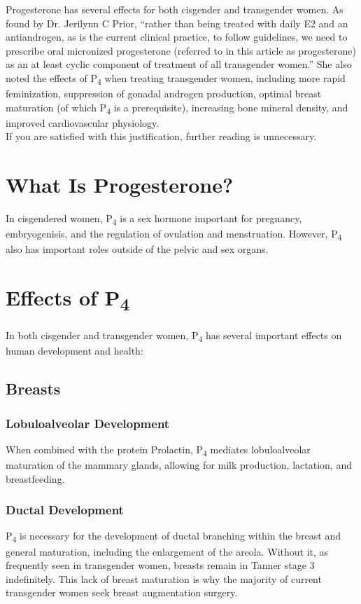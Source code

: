 \documentclass[
	secnumdepth=3, %
]{kaohandt}
\newcommand\tsub[1]{\textsubscript{#1}}
\begin{document}
\noindent Progesterone has several effects for both cisgender and transgender women. As found by Dr. Jerilynn C Prior, ``rather than being treated with daily E2 and an antiandrogen, as is the current clinical practice, to follow guidelines, we need to prescribe oral micronized progesterone (referred to in this article as progesterone) as an at least cyclic component of treatment of all transgender women.'' She also noted the effects of P\tsub{4} when treating transgender women, including more rapid feminization, suppression of gonadal androgen production, optimal breast maturation (of which P\tsub{4} is a prerequisite), increasing bone mineral density, and improved cardiovascular physiology.\\

\noindent If you are satisfied with this justification, further reading is unnecessary.

\section{What Is Progesterone?}

In cisgendered women, P\tsub{4} is a sex hormone important for pregnancy, embryogenisis, and the regulation of ovulation and menstruation. However, P\tsub{4} also has important roles outside of the pelvic and sex organs.

\section{Effects of P\tsub{4}}
In both cisgender and transgender women, P\tsub{4} has several important effects on human development and health:
\subsection{Breasts}

\subsubsection{Lobuloalveolar Development}
When combined with the protein Prolactin, P\tsub{4} mediates lobuloalveolar maturation of the mammary glands, allowing for milk production, lactation, and breastfeeding.

\subsubsection{Ductal Development}
P\tsub{4} is necessary for the development of ductal branching within the breast and general maturation, including the enlargement of the areola. Without it, as frequently seen in transgender women, breasts remain in Tanner stage 3 indefinitely. This lack of breast maturation is why the majority of current transgender women seek breast augmentation surgery.
\end{document}
